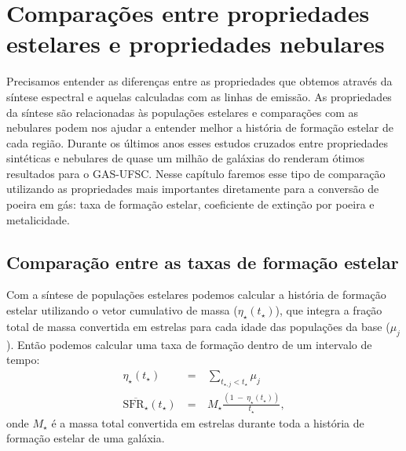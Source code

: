 


\chapter{Comparações entre propriedades estelares e propriedades nebulares}
\label{sec:synvsneb}

Precisamos entender as diferenças entre as propriedades que obtemos através da síntese espectral e
aquelas calculadas com as linhas de emissão. As propriedades da síntese são relacionadas às
populações estelares e comparações com as nebulares podem nos ajudar a entender melhor a história de
formação estelar de cada região. Durante os últimos anos esses estudos cruzados entre propriedades
sintéticas e nebulares de quase um milhão de galáxias do \SDSS renderam ótimos resultados para o
GAS-UFSC. Nesse capítulo faremos esse tipo de comparação utilizando as propriedades mais importantes
diretamente para a conversão de poeira em gás: taxa de formação estelar, coeficiente de extinção por
poeira e metalicidade.

\section{Comparação entre as taxas de formação estelar}
\label{sec:synvsneb:SFR}

Com a síntese de populações estelares podemos calcular a história de formação estelar utilizando o
vetor cumulativo de massa ($\eta_\star(t_\star)$), que integra a fração total de massa convertida em
estrelas para cada idade das populações da base ($\mu_j$). Então podemos calcular uma taxa de
formação dentro de um intervalo de tempo:
\begin{eqnarray}
	\eta_\star(t_\star)\ &=&\ \sum\limits_{t_{\star,j} < t_\star} \mu_j \\
	\overline{\mathrm{SFR}_\star}(t_\star)\ &=&\ M_\star \frac{(1\ -\ \eta_\star(t_\star))}{t_\star},
	\label{eq:SFRSyn}
\end{eqnarray}
\noindent onde $M_\star$ é a massa total convertida em estrelas durante toda a história de
formação estelar de uma galáxia. 

